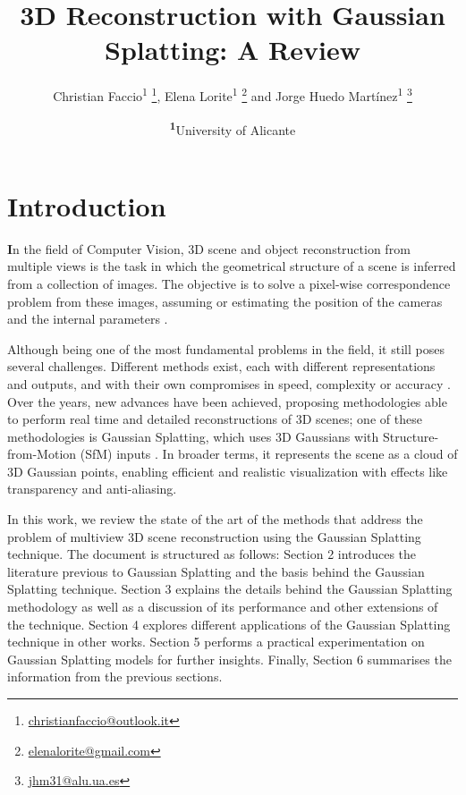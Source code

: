 \documentclass[
	a4paper, %
	10pt, %
	unnumberedsections, %
	twoside, %
]{LTJournalArticle}
\title{3D Reconstruction with Gaussian Splatting: A Review} %
\author{%
	Christian Faccio\textsuperscript{1} \thanks{\href{mailto:christianfaccio@outlook.it}{christianfaccio@outlook.it}}, 
    Elena Lorite\textsuperscript{1} \thanks{\href{mailto:elenalorite@gmail.com}{elenalorite@gmail.com}} and
    Jorge Huedo Martínez\textsuperscript{1} \thanks{\href{mailto:jhm31@alu.ua.es}{jhm31@alu.ua.es}} 
}
\date{\footnotesize\textsuperscript{\textbf{1}}University of Alicante}
\begin{document}
\maketitle %


\section{Introduction}
\lettrine[findent=2pt]{\textbf{I}}{}n the field of Computer Vision, 3D scene and object reconstruction from multiple views is the task in which the geometrical structure of a scene is inferred from a collection of images. The objective is to solve a pixel-wise correspondence problem from these images, assuming or estimating the position of the cameras and the internal parameters \cite{tum_mvr}.

Although being one of the most fundamental problems in the field, it still poses several challenges. Different methods exist, each with different representations and outputs, and with their own compromises in speed, complexity or accuracy \cite{review_3drecon_2025}. Over the years, new advances have been achieved, proposing methodologies able to perform real time and detailed reconstructions of 3D scenes; one of these methodologies is Gaussian Splatting, which uses 3D Gaussians with Structure-from-Motion (SfM) inputs \cite{kerbl20233dgs}. In broader terms, it represents the scene as a cloud of 3D Gaussian points, enabling efficient and realistic visualization with effects like transparency and anti-aliasing.

In this work, we review the state of the art of the methods that address the problem of multiview 3D scene reconstruction using the Gaussian Splatting technique. The document is structured as follows: Section 2 introduces the literature previous to Gaussian Splatting and the basis behind the Gaussian Splatting technique. Section 3 explains the details behind the Gaussian Splatting methodology as well as a discussion of its performance and other extensions of the technique. Section 4 explores different applications of the Gaussian Splatting technique in other works. Section 5 performs a practical experimentation on Gaussian Splatting models for further insights. Finally, Section 6 summarises the information from the previous sections.
\end{document}
